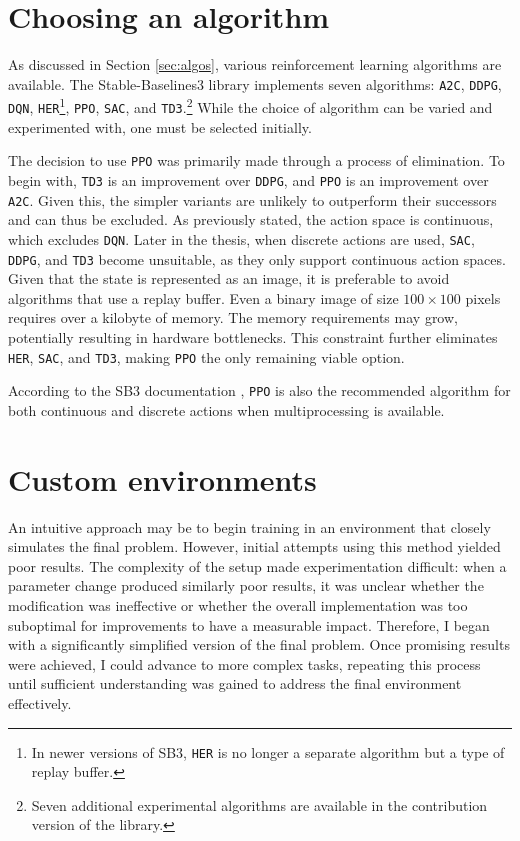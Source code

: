 \documentclass[
  digital,     %
  oneside,     %
  nosansbold,  %
  nocolorbold, %
  lof,         %
  lot,         %
]{fithesis4}
\begin{document}
\section{Choosing an algorithm}
\label{sec:algo_choice}
As discussed in Section \ref{sec:algos}, various reinforcement learning algorithms are available. The Stable-Baselines3 library implements seven algorithms: \texttt{A2C}, \texttt{DDPG}, \texttt{DQN}, \texttt{HER}\footnote{In newer versions of SB3, \texttt{HER} is no longer a separate algorithm but a type of replay buffer.}, \texttt{PPO}, \texttt{SAC}, and \texttt{TD3}.\footnote{Seven additional experimental algorithms are available in the contribution version of the library.} While the choice of algorithm can be varied and experimented with, one must be selected initially.

The decision to use \texttt{PPO} was primarily made through a process of elimination. To begin with, \texttt{TD3} is an improvement over \texttt{DDPG}, and \texttt{PPO} is an improvement over \texttt{A2C}. Given this, the simpler variants are unlikely to outperform their successors and can thus be excluded. As previously stated, the action space is continuous, which excludes \texttt{DQN}. Later in the thesis, when discrete actions are used, \texttt{SAC}, \texttt{DDPG}, and \texttt{TD3} become unsuitable, as they only support continuous action spaces. Given that the state is represented as an image, it is preferable to avoid algorithms that use a replay buffer. Even a binary image of size $100\times100$ pixels requires over a kilobyte of memory. The memory requirements may grow, potentially resulting in hardware bottlenecks. This constraint further eliminates \texttt{HER}, \texttt{SAC}, and \texttt{TD3}, making \texttt{PPO} the only remaining viable option.

According to the SB3 documentation \cite{SB3-docs}, \texttt{PPO} is also the recommended algorithm for both continuous and discrete actions when multiprocessing is available.

\section{Custom environments}
An intuitive approach may be to begin training in an environment that closely simulates the final problem. However, initial attempts using this method yielded poor results. The complexity of the setup made experimentation difficult: when a parameter change produced similarly poor results, it was unclear whether the modification was ineffective or whether the overall implementation was too suboptimal for improvements to have a measurable impact. Therefore, I began with a significantly simplified version of the final problem. Once promising results were achieved, I could advance to more complex tasks, repeating this process until sufficient understanding was gained to address the final environment effectively.
\end{document}
